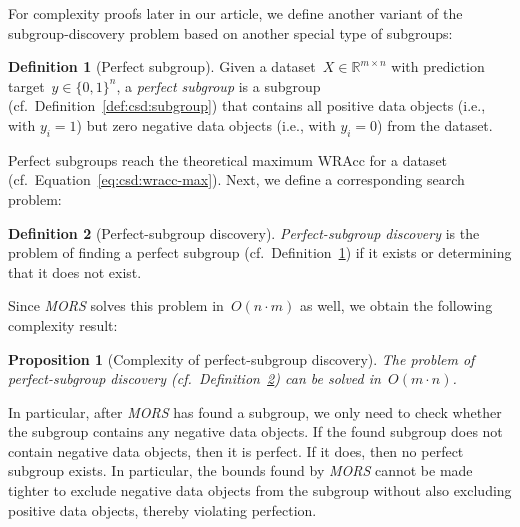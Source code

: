 \documentclass{article}
\newtheorem{proposition}{Proposition}
\theoremstyle{definition}
\newtheorem{definition}{Definition}
\begin{document}
For complexity proofs later in our article, we define another variant of the subgroup-discovery problem based on another special type of subgroups:
%
\begin{definition}[Perfect subgroup]
	Given a dataset~$X \in \mathbb{R}^{m \times n}$ with prediction target~$y \in \{0, 1\}^n$,
	a \emph{perfect subgroup} is a subgroup (cf.~Definition~\ref{def:csd:subgroup}) that contains all positive data objects (i.e., with $y_i = 1$) but zero negative data objects (i.e., with $y_i = 0$) from the dataset.
	\label{def:csd:perfect-subgroup}
\end{definition}
%
Perfect subgroups reach the theoretical maximum WRAcc for a dataset (cf.~Equation~\ref{eq:csd:wracc-max}).
Next, we define a corresponding search problem:
%
\begin{definition}[Perfect-subgroup discovery]
	\emph{Perfect-subgroup discovery} is the problem of finding a perfect subgroup (cf.~Definition~\ref{def:csd:perfect-subgroup}) if it exists or determining that it does not exist.
	\label{def:csd:perfect-subgroup-discovery}
\end{definition}
%
Since \emph{MORS} solves this problem in~$O(n \cdot m)$ as well, we obtain the following complexity result:
%
\begin{proposition}[Complexity of perfect-subgroup discovery]
	The problem of perfect-subgroup discovery (cf.~Definition~\ref{def:csd:perfect-subgroup-discovery}) can be solved in~$O(m \cdot n)$.
	\label{prop:csd:complexity-unconstrained-perfect-subgroup}
\end{proposition}
%
In particular, after \emph{MORS} has found a subgroup, we only need to check whether the subgroup contains any negative data objects.
If the found subgroup does not contain negative data objects, then it is perfect.
If it does, then no perfect subgroup exists.
In particular, the bounds found by \emph{MORS} cannot be made tighter to exclude negative data objects from the subgroup without also excluding positive data objects, thereby violating perfection.
\end{document}
